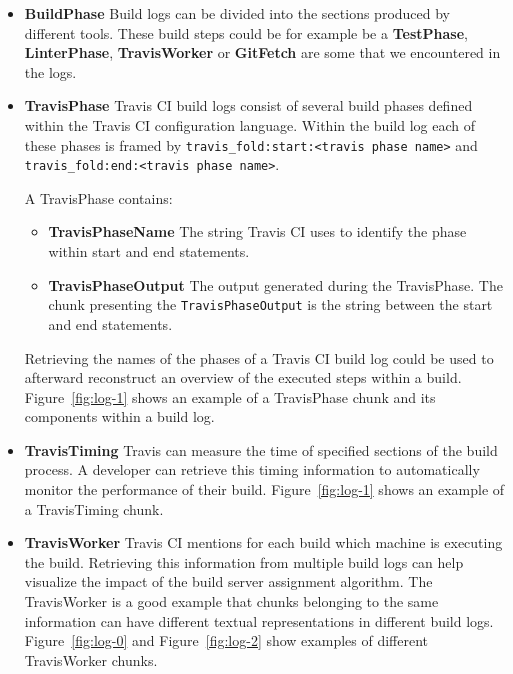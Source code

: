 \documentclass[\myrootdir/main.tex]{subfiles}
\begin{document}
\begin{itemize}
	\item \textbf{BuildPhase} Build logs can be divided into the sections produced by different tools.
	      These build steps could be for example be a \textbf{TestPhase}, \textbf{LinterPhase}, \textbf{TravisWorker} or \textbf{GitFetch} are some that we encountered in the logs.

	\item \textbf{TravisPhase} Travis CI build logs consist of several build phases defined within the Travis CI configuration language. Within the build log each of these phases is framed by \lstinline{travis_fold:start:<travis phase name>} and \\ \lstinline{travis_fold:end:<travis phase name>}.

	      A TravisPhase contains:
	      \begin{itemize}
		      \item \textbf{TravisPhaseName} The string Travis CI uses to identify the phase within start and end statements.
		      \item \textbf{TravisPhaseOutput} The output generated during the TravisPhase. The chunk presenting the \texttt{TravisPhaseOutput} is the string between the start and end statements.
	      \end{itemize}
				 Retrieving the names of the phases of a Travis CI build log could be used to afterward reconstruct an overview of the executed steps within a build.
	       Figure~\ref{fig:log-1} shows an example of a TravisPhase chunk and its components within a build log.

	\item \textbf{TravisTiming} Travis can measure the time of specified sections of the build process.
				A developer can retrieve this timing information to automatically monitor the performance of their build.
	      Figure~\ref{fig:log-1} shows an example of a TravisTiming chunk.

	\item \textbf{TravisWorker} Travis CI mentions for each build which machine is executing the build.
	      Retrieving this information from multiple build logs can help visualize the impact of the build server assignment algorithm.
	      The TravisWorker is a good example that chunks belonging to the same information can have different textual representations in different build logs.
	      Figure~\ref{fig:log-0} and Figure~\ref{fig:log-2} show examples of different TravisWorker chunks.


\end{itemize}
\end{document}
